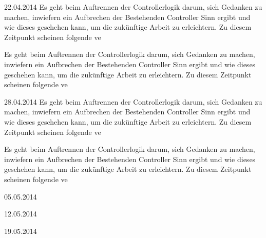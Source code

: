 \begin{bundle}{22.04.2014}
%
Es geht beim Auftrennen der Controllerlogik darum, sich Gedanken zu machen, inwiefern ein Aufbrechen der Bestehenden Controller Sinn ergibt und wie dieses geschehen kann, um die zukünftige Arbeit zu erleichtern. Zu diesem Zeitpunkt scheinen folgende ve


%
Es geht beim Auftrennen der Controllerlogik darum, sich Gedanken zu machen, inwiefern ein Aufbrechen der Bestehenden Controller Sinn ergibt und wie dieses geschehen kann, um die zukünftige Arbeit zu erleichtern. Zu diesem Zeitpunkt scheinen folgende ve
\end{bundle}


\begin{bundle}{28.04.2014}
%
Es geht beim Auftrennen der Controllerlogik darum, sich Gedanken zu machen, inwiefern ein Aufbrechen der Bestehenden Controller Sinn ergibt und wie dieses geschehen kann, um die zukünftige Arbeit zu erleichtern. Zu diesem Zeitpunkt scheinen folgende ve


%
Es geht beim Auftrennen der Controllerlogik darum, sich Gedanken zu machen, inwiefern ein Aufbrechen der Bestehenden Controller Sinn ergibt und wie dieses geschehen kann, um die zukünftige Arbeit zu erleichtern. Zu diesem Zeitpunkt scheinen folgende ve
\end{bundle}


\begin{bundle}{05.05.2014}

\end{bundle}


\begin{bundle}{12.05.2014}

\end{bundle}


\begin{bundle}{19.05.2014}

\end{bundle}


